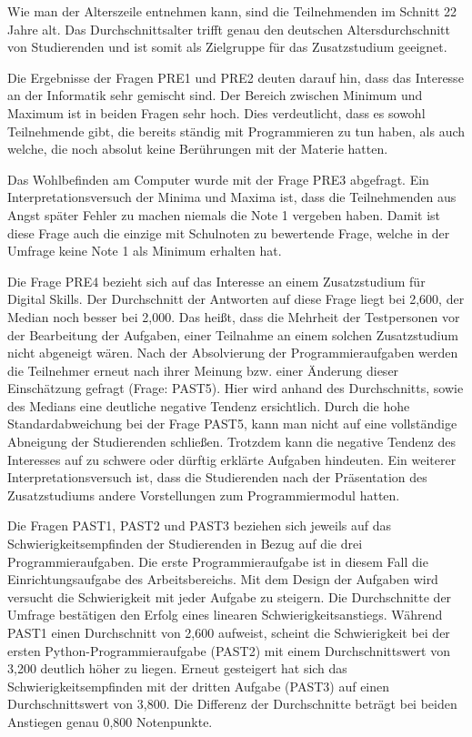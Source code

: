 Wie man der Alterszeile entnehmen kann, sind die Teilnehmenden im Schnitt 22
Jahre alt. Das Durchschnittsalter trifft genau den deutschen Altersdurchschnitt
von Studierenden und ist somit als Zielgruppe für das Zusatzstudium geeignet.
\parencite{studie-alter-studierenden}

Die Ergebnisse der Fragen PRE1 und PRE2 deuten darauf hin, dass das Interesse
an der Informatik sehr gemischt sind. Der Bereich zwischen Minimum und Maximum
ist in beiden Fragen sehr hoch. Dies verdeutlicht, dass es sowohl Teilnehmende
gibt, die bereits ständig mit Programmieren zu tun haben, als auch welche, die
noch absolut keine Berührungen mit der Materie hatten.

Das Wohlbefinden am Computer wurde mit der Frage PRE3 abgefragt. Ein
Interpretationsversuch der Minima und Maxima ist, dass die Teilnehmenden aus
Angst später Fehler zu machen niemals die Note 1 vergeben haben. Damit ist diese
Frage auch die einzige mit Schulnoten zu bewertende Frage, welche in der Umfrage
keine Note 1 als Minimum erhalten hat.

Die Frage PRE4 bezieht sich auf das Interesse an einem Zusatzstudium für
Digital Skills. Der Durchschnitt der Antworten auf diese Frage liegt bei 2,600,
der Median noch besser bei 2,000. Das heißt, dass die Mehrheit der Testpersonen
vor der Bearbeitung der Aufgaben, einer Teilnahme an einem solchen Zusatzstudium
nicht abgeneigt wären. Nach der Absolvierung der Programmieraufgaben werden die 
Teilnehmer erneut nach ihrer Meinung bzw. einer Änderung dieser Einschätzung
gefragt (Frage: PAST5). Hier wird anhand des Durchschnitts, sowie des Medians
eine deutliche negative Tendenz ersichtlich. Durch die hohe Standardabweichung
bei der Frage PAST5, kann man nicht auf eine vollständige Abneigung der
Studierenden schließen. Trotzdem kann die negative Tendenz des Interesses auf zu
schwere oder dürftig erklärte Aufgaben hindeuten. Ein weiterer
Interpretationsversuch ist, dass die Studierenden nach der Präsentation des 
Zusatzstudiums andere Vorstellungen zum Programmiermodul hatten.

Die Fragen PAST1, PAST2 und PAST3 beziehen sich jeweils auf das
Schwierigkeitsempfinden der Studierenden in Bezug auf die drei
Programmieraufgaben. Die erste Programmieraufgabe ist in diesem Fall die
Einrichtungsaufgabe des Arbeitsbereichs. Mit dem Design der Aufgaben wird
versucht die Schwierigkeit mit jeder Aufgabe zu steigern. Die Durchschnitte der
Umfrage bestätigen den Erfolg eines linearen Schwierigkeitsanstiegs. Während
PAST1 einen Durchschnitt von 2,600 aufweist, scheint die Schwierigkeit bei der
ersten Python-Programmieraufgabe (PAST2) mit einem Durchschnittswert von 3,200
deutlich höher zu liegen. Erneut gesteigert hat sich das Schwierigkeitsempfinden
mit der dritten Aufgabe (PAST3) auf einen Durchschnittswert von 3,800. Die
Differenz der Durchschnitte beträgt bei beiden Anstiegen genau 0,800
Notenpunkte.


